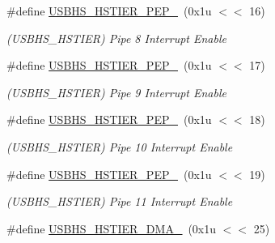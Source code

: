\begin{DoxyCompactItemize}
\mbox{\label{group__SAMV71__USBHS_ga4b7e9566a64821243147c3950f3a60d5}} 
\#define \mbox{\hyperlink{group__SAMV71__USBHS_ga4b7e9566a64821243147c3950f3a60d5}{U\+S\+B\+H\+S\+\_\+\+H\+S\+T\+I\+E\+R\+\_\+\+P\+E\+P\+\_}}~(0x1u $<$$<$ 16)
\begin{DoxyCompactList}\small\item\em (U\+S\+B\+H\+S\+\_\+\+H\+S\+T\+I\+ER) Pipe 8 Interrupt Enable \end{DoxyCompactList}\item 
\mbox{\label{group__SAMV71__USBHS_ga5e5d8101cfdc2396ce20e75be173b1f7}} 
\#define \mbox{\hyperlink{group__SAMV71__USBHS_ga5e5d8101cfdc2396ce20e75be173b1f7}{U\+S\+B\+H\+S\+\_\+\+H\+S\+T\+I\+E\+R\+\_\+\+P\+E\+P\+\_}}~(0x1u $<$$<$ 17)
\begin{DoxyCompactList}\small\item\em (U\+S\+B\+H\+S\+\_\+\+H\+S\+T\+I\+ER) Pipe 9 Interrupt Enable \end{DoxyCompactList}\item 
\mbox{\label{group__SAMV71__USBHS_ga0624c6ef33a6f52bc5e59b739587c8b9}} 
\#define \mbox{\hyperlink{group__SAMV71__USBHS_ga0624c6ef33a6f52bc5e59b739587c8b9}{U\+S\+B\+H\+S\+\_\+\+H\+S\+T\+I\+E\+R\+\_\+\+P\+E\+P\+\_}}~(0x1u $<$$<$ 18)
\begin{DoxyCompactList}\small\item\em (U\+S\+B\+H\+S\+\_\+\+H\+S\+T\+I\+ER) Pipe 10 Interrupt Enable \end{DoxyCompactList}\item 
\mbox{\label{group__SAMV71__USBHS_ga2613a3c81d45c37427721970885786cb}} 
\#define \mbox{\hyperlink{group__SAMV71__USBHS_ga2613a3c81d45c37427721970885786cb}{U\+S\+B\+H\+S\+\_\+\+H\+S\+T\+I\+E\+R\+\_\+\+P\+E\+P\+\_}}~(0x1u $<$$<$ 19)
\begin{DoxyCompactList}\small\item\em (U\+S\+B\+H\+S\+\_\+\+H\+S\+T\+I\+ER) Pipe 11 Interrupt Enable \end{DoxyCompactList}\item 
\mbox{\label{group__SAMV71__USBHS_ga969f463accb76d2fa7e9a36fab75e907}} 
\#define \mbox{\hyperlink{group__SAMV71__USBHS_ga969f463accb76d2fa7e9a36fab75e907}{U\+S\+B\+H\+S\+\_\+\+H\+S\+T\+I\+E\+R\+\_\+\+D\+M\+A\+\_}}~(0x1u $<$$<$ 25)
$$
\end{DoxyCompactItemize}
